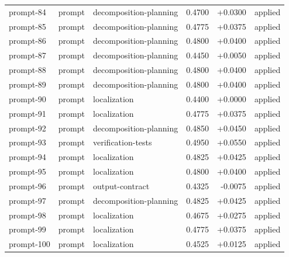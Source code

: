 \begin{center}
\begin{longtable}{llp{5.2cm}rrl}
prompt-84 & prompt & decomposition-planning & 0.4700 & +0.0300 & applied \\
prompt-85 & prompt & decomposition-planning & 0.4775 & +0.0375 & applied \\
prompt-86 & prompt & decomposition-planning & 0.4800 & +0.0400 & applied \\
prompt-87 & prompt & decomposition-planning & 0.4450 & +0.0050 & applied \\
prompt-88 & prompt & decomposition-planning & 0.4800 & +0.0400 & applied \\
prompt-89 & prompt & decomposition-planning & 0.4800 & +0.0400 & applied \\
prompt-90 & prompt & localization & 0.4400 & +0.0000 & applied \\
prompt-91 & prompt & localization & 0.4775 & +0.0375 & applied \\
prompt-92 & prompt & decomposition-planning & 0.4850 & +0.0450 & applied \\
prompt-93 & prompt & verification-tests & 0.4950 & +0.0550 & applied \\
prompt-94 & prompt & localization & 0.4825 & +0.0425 & applied \\
prompt-95 & prompt & localization & 0.4800 & +0.0400 & applied \\
prompt-96 & prompt & output-contract & 0.4325 & -0.0075 & applied \\
prompt-97 & prompt & decomposition-planning & 0.4825 & +0.0425 & applied \\
prompt-98 & prompt & localization & 0.4675 & +0.0275 & applied \\
prompt-99 & prompt & localization & 0.4775 & +0.0375 & applied \\
prompt-100 & prompt & localization & 0.4525 & +0.0125 & applied \\
\bottomrule\end{longtable}\end{center}
\clearpage
